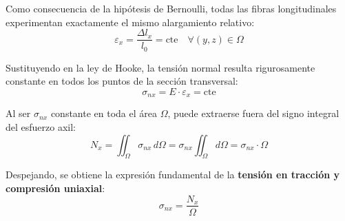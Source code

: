 Como consecuencia de la hipótesis de Bernoulli, todas las fibras longitudinales experimentan exactamente el mismo alargamiento relativo:
\begin{equation}
    \varepsilon_x = \frac{\Delta l_x}{l_0} = \text{cte} \quad \forall (y,z) \in \Omega
\end{equation}

Sustituyendo en la ley de Hooke, la tensión normal resulta rigurosamente constante en todos los puntos de la sección transversal:
\begin{equation}
    \sigma_{nx} = E \cdot \varepsilon_x = \text{cte}
\end{equation}

Al ser $\sigma_{nx}$ constante en toda el área $\Omega$, puede extraerse fuera del signo integral del esfuerzo axil:
\begin{equation}
    N_x = \iint_{\Omega} \sigma_{nx} \, d\Omega = \sigma_{nx} \iint_{\Omega} d\Omega = \sigma_{nx} \cdot \Omega
\end{equation}

Despejando, se obtiene la expresión fundamental de la \textbf{tensión en tracción y compresión uniaxial}:
\begin{equation}
    \boxed{\sigma_{nx} = \frac{N_x}{\Omega}}
\end{equation}

